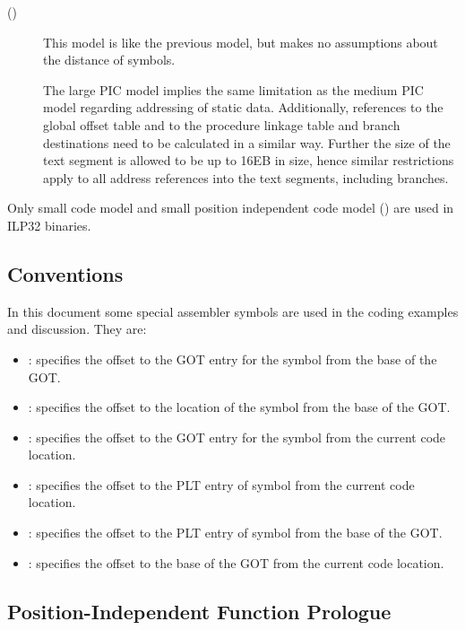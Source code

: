 \begin{description}
\item[
  ()]

  This model is like the previous model, but makes no assumptions
  about the distance of symbols.

  The large PIC model implies the same limitation as the medium
  PIC model regarding addressing of static data.  Additionally,
  references to the global offset table and to the procedure linkage
  table and branch destinations need to be calculated in a similar
  way.  Further the size of the text segment is allowed to be up to
  16EB in size, hence similar restrictions apply to all address
  references into the text segments, including branches.

\end{description}

Only small code model and small position independent code model
() are used in ILP32 binaries.

\subsection{Conventions}

In this document some special assembler symbols are used in the coding
examples and discussion.  They are:

\begin{itemize}
\item {}: specifies the offset to the GOT entry for
      the symbol  from the base of the GOT.
\item {}: specifies the offset to the location of
      the symbol  from the base of the GOT.
\item {}: specifies the offset to the GOT entry
      for the symbol  from the current code location.
\item {}: specifies the offset to the PLT entry of
      symbol  from the current code location.
\item {}: specifies the offset to the PLT entry of
      symbol  from the base of the GOT.
\item {}: specifies the offset to the base
      of the GOT from the current code location.
\end{itemize}

\subsection{Position-Independent Function Prologue}


